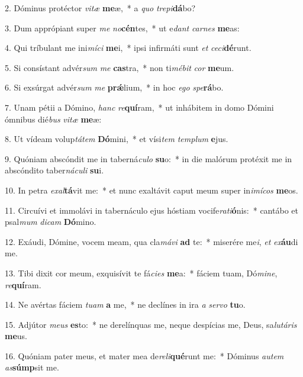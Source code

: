 2. Dóminus protéctor \textit{vi}\textit{tæ} \textbf{me}æ,~*  a \textit{quo} \textit{tre}\textit{pi}\textbf{dá}bo?\

3. Dum apprópiant super \textit{me} \textit{no}\textbf{cén}tes,~*  ut e\textit{dant} \textit{car}\textit{nes} \textbf{me}as:\

4. Qui tríbulant me ini\textit{mí}\textit{ci} \textbf{me}i,~*  ipsi infirmáti sunt \textit{et} \textit{ce}\textit{ci}\textbf{dé}runt.\

5. Si consístant advér\textit{sum} \textit{me} \textbf{cas}tra,~*  non ti\textit{mé}\textit{bit} \textit{cor} \textbf{me}um.\

6. Si exsúrgat advér\textit{sum} \textit{me} \textbf{prǽ}lium,~*  in hoc \textit{e}\textit{go} \textit{spe}\textbf{rá}bo.\

7. Unam pétii a Dómino, \textit{hanc} \textit{re}\textbf{quí}ram,~*  ut inhábitem in domo Dómini ómnibus dié\textit{bus} \textit{vi}\textit{tæ} \textbf{me}æ:\

8. Ut vídeam volup\textit{tá}\textit{tem} \textbf{Dó}mini,~*  et vísi\textit{tem} \textit{tem}\textit{plum} \textbf{e}jus.\

9. Quóniam abscóndit me in taberná\textit{cu}\textit{lo} \textbf{su}o:~*  in die malórum protéxit me in abscóndito taber\textit{ná}\textit{cu}\textit{li} \textbf{su}i.\

10. In petra \textit{ex}\textit{al}\textbf{tá}vit me:~*  et nunc exaltávit caput meum super in\textit{i}\textit{mí}\textit{cos} \textbf{me}os.\

11. Circuívi et immolávi in tabernáculo ejus hóstiam vocife\textit{ra}\textit{ti}\textbf{ó}nis:~*  cantábo et psal\textit{mum} \textit{di}\textit{cam} \textbf{Dó}mino.\

12. Exáudi, Dómine, vocem meam, qua cla\textit{má}\textit{vi} \textbf{ad} te:~*  miserére me\textit{i}, \textit{et} \textit{ex}\textbf{áu}di me.\

13. Tibi dixit cor meum, exquisívit te fá\textit{ci}\textit{es} \textbf{me}a:~*  fáciem tuam, Dó\textit{mi}\textit{ne}, \textit{re}\textbf{quí}ram.\

14. Ne avértas fáciem \textit{tu}\textit{am} \textbf{a} me,~*  ne declínes in ira \textit{a} \textit{ser}\textit{vo} \textbf{tu}o.\

15. Adjútor \textit{me}\textit{us} \textbf{es}to:~*  ne derelínquas me, neque despícias me, Deus, sa\textit{lu}\textit{tá}\textit{ris} \textbf{me}us.\

16. Quóniam pater meus, et mater mea de\textit{re}\textit{li}\textbf{qué}runt me:~*  Dóminus \textit{au}\textit{tem} \textit{as}\textbf{súmp}sit me.\

